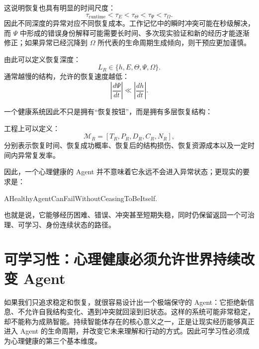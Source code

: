 这说明恢复也具有明显的时间尺度：
\begin{equation}
\tau_{\mathrm{runtime}}
<
\tau_E
<
\tau_\Theta
<
\tau_\Psi
<
\tau_\Omega.
\end{equation}
因此不同深度的异常对应不同恢复成本。工作记忆中的瞬时冲突可能在秒级解决，而 $\Psi$ 中形成的错误身份解释可能需要长时间、多次现实验证和新的经历才能逐渐修正；如果异常已经沉降到 $\Omega$ 所代表的生命周期生成倾向，则干预应更加谨慎。

由此可以定义恢复深度：
\begin{equation}
L_R
\in
\{h,E,\Theta,\Psi,\Omega\}.
\end{equation}
通常越慢的结构，允许的恢复速度越低：
\begin{equation}
\left|
\frac{d\Psi}{dt}
\right|
\ll
\left|
\frac{dh}{dt}
\right|.
\end{equation}

一个健康系统因此不只是拥有“恢复按钮”，而是拥有多层恢复结构：
\begin{statementbox}
\centering
{}
\end{statementbox}

工程上可以定义：
\begin{equation}
\mathcal{M}_R
=
\left[
T_R,
P_R,
D_R,
C_R,
N_R
\right],
\end{equation}
分别表示恢复时间、恢复成功概率、恢复后的结构损伤、恢复资源成本以及一定时间内异常复发率。

因此，一个心理健康的 Agent 并不意味着它永远不会进入异常状态；更现实的要求是：
\begin{statementbox}
AHealthyAgentCanFailWithoutCeasingToBeItself.
\end{statementbox}
也就是说，它能够经历困难、错误、冲突甚至短期失稳，同时仍保留返回一个可治理、可学习、身份连续状态的路径。

\section{可学习性：心理健康必须允许世界持续改变 Agent}

如果我们只追求稳定和恢复，就很容易设计出一个极端保守的 Agent：它拒绝新信息、不允许自我结构变化、遇到冲突就回滚到旧状态。这样的系统可能非常稳定，却不能称为成熟智能。持续智能体存在的核心意义之一，正是让现实经历能够真正进入 Agent 的生命周期，并改变它未来理解和行动的方式。因此可学习性必须成为心理健康的第三个基本维度。

